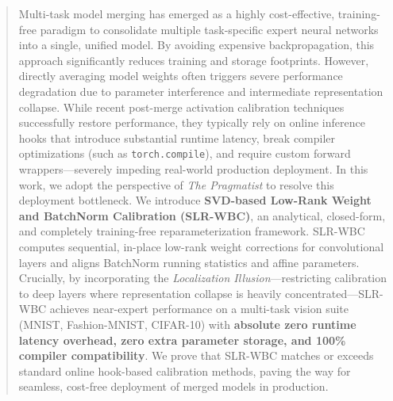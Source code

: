 \documentclass{article}
\theoremstyle{plain}
\theoremstyle{definition}
\theoremstyle{remark}
\begin{document}

\printAffiliationsAndNotice{}

\begin{abstract}
Multi-task model merging has emerged as a highly cost-effective, training-free paradigm to consolidate multiple task-specific expert neural networks into a single, unified model. By avoiding expensive backpropagation, this approach significantly reduces training and storage footprints. However, directly averaging model weights often triggers severe performance degradation due to parameter interference and intermediate representation collapse. While recent post-merge activation calibration techniques successfully restore performance, they typically rely on online inference hooks that introduce substantial runtime latency, break compiler optimizations (such as \texttt{torch.compile}), and require custom forward wrappers—severely impeding real-world production deployment. In this work, we adopt the perspective of \textit{The Pragmatist} to resolve this deployment bottleneck. We introduce \textbf{SVD-based Low-Rank Weight and BatchNorm Calibration (SLR-WBC)}, an analytical, closed-form, and completely training-free reparameterization framework. SLR-WBC computes sequential, in-place low-rank weight corrections for convolutional layers and aligns BatchNorm running statistics and affine parameters. Crucially, by incorporating the \textit{Localization Illusion}—restricting calibration to deep layers where representation collapse is heavily concentrated—SLR-WBC achieves near-expert performance on a multi-task vision suite (MNIST, Fashion-MNIST, CIFAR-10) with \textbf{absolute zero runtime latency overhead, zero extra parameter storage, and 100\% compiler compatibility}. We prove that SLR-WBC matches or exceeds standard online hook-based calibration methods, paving the way for seamless, cost-free deployment of merged models in production.
\end{abstract}
\end{document}
